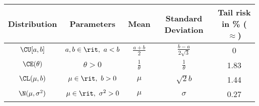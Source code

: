 \begin{tabular}{c|c c c c}
	\hline\hline
	Distribution & Parameters & Mean & Standard Deviation & Tail risk in \% (\(\approx\))\\
	\hline
	\(\CU[a,b]\) & \(a,b\in\rit,\ a<b\) & \(\frac{a+b}{2}\) & \(\frac{b-a}{2\sqrt{3}}\) & 0\\
	\(\CE(\theta)\) & \(\theta>0\) & \(\frac{1}{\theta}\) & \(\frac{1}{\theta}\) & 1.83\\
	\(\CL(\mu,b)\) & \(\mu\in\rit,\ b>0\) & \(\mu\) & \(\sqrt{2}b\) & 1.44\\
	\(\N(\mu,\sigma^2)\) &
	\(\mu\in\rit,\ \sigma^2>0\) & \(\mu\) & \(\sigma\) & 0.27\\
	\hline\hline
\end{tabular}